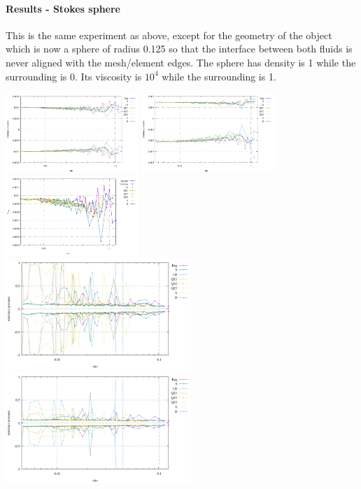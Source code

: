 \newpage
\paragraph{Results - Stokes sphere}

This is the same experiment as above, except for the geometry of the object 
which is now a sphere of radius 0.125 so that the interface between both fluids 
is never aligned with the mesh/element edges. The sphere has density is 1 while the surrounding is 0.
Its viscosity is $10^4$ while the surrounding is 1.


\begin{center}
\includegraphics[width=5cm]{python_codes/fieldstone_78/results/sphere/ustats}
\includegraphics[width=5cm]{python_codes/fieldstone_78/results/sphere/vstats}
\includegraphics[width=5cm]{python_codes/fieldstone_78/results/sphere/vrms.pdf}\\
\includegraphics[width=7cm]{python_codes/fieldstone_78/results/sphere/pstats.pdf}
\includegraphics[width=7cm]{python_codes/fieldstone_78/results/sphere/qstats}
\end{center}



